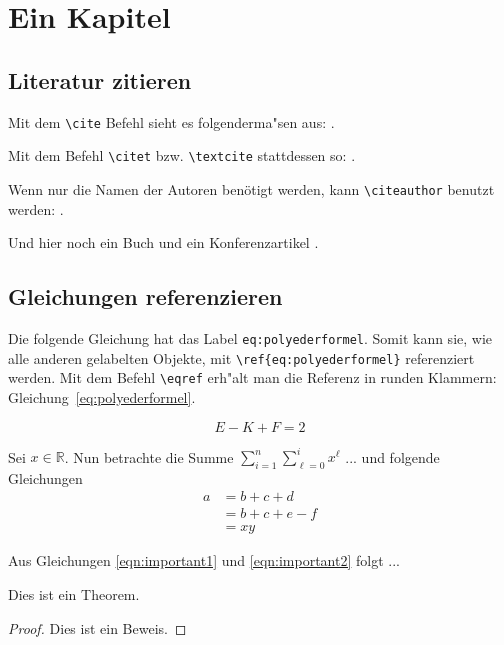 \section{Ein Kapitel}
\label{sec:kapitel}

\subsection{Literatur zitieren}

Mit dem \texttt{\textbackslash{}cite} Befehl sieht es folgenderma"sen aus:
\cite{Lehnfeld2014}.

Mit dem Befehl \texttt{\textbackslash{}citet} bzw. \texttt{\textbackslash{}textcite} stattdessen so:
\textcite{Lehnfeld2014}.

Wenn nur die Namen der Autoren benötigt werden, kann
\texttt{\textbackslash{}citeauthor} benutzt werden: \citeauthor{Lehnfeld2014}.

Und hier noch ein Buch \cite{Brucker2007} und ein Konferenzartikel 
\cite{Huang2010}.

\subsection{Gleichungen referenzieren}
\label{sec:gleichungen-referenzieren}

Die folgende Gleichung hat das Label \texttt{eq:polyederformel}.
Somit kann sie, wie alle anderen gelabelten Objekte, mit
\texttt{\textbackslash{}ref\{eq:polyederformel\}}
referenziert werden.
Mit dem Befehl \texttt{\textbackslash{}eqref} 
erh"alt man die Referenz in runden Klammern: 
Gleichung~\eqref{eq:polyederformel}.

\begin{equation}
  \label{eq:polyederformel}
  E - K + F = 2
\end{equation}

Sei $x \in \mathbb{R}$. Nun betrachte die Summe $\sum_{i=1}^n \sum_{\ell = 0}^{i} x^\ell$ ... und folgende Gleichungen
\begin{align}
a &= b + c + d      \label{eqn:important1} \\
  &= b + c + e - f  \nonumber \\
  &= xy             \label{eqn:important2}
\end{align}

Aus Gleichungen \eqref{eqn:important1} und \eqref{eqn:important2} folgt ...

\begin{mytheorem}
	Dies ist ein Theorem.
\end{mytheorem}
\begin{proof}
	Dies ist ein Beweis.
\end{proof}

